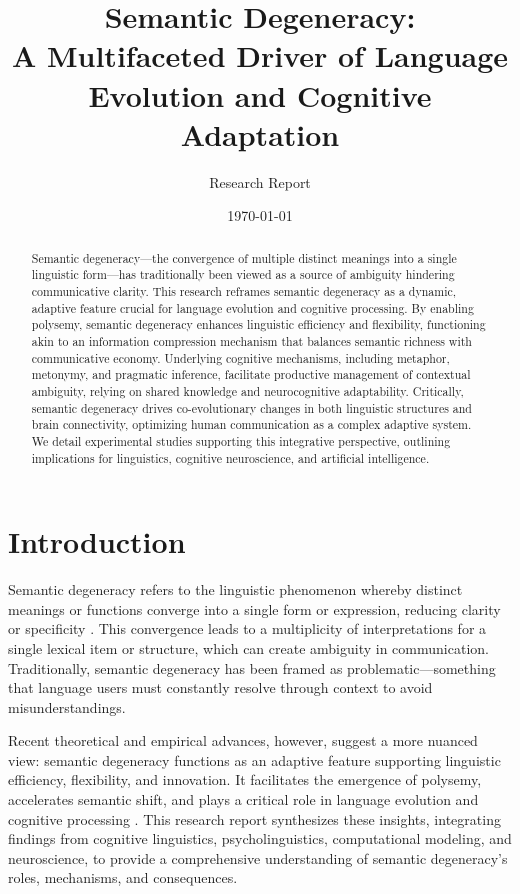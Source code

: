 \documentclass[12pt,a4paper]{article}
\title{Semantic Degeneracy:\\ 
A Multifaceted Driver of Language Evolution and Cognitive Adaptation}
\author{Research Report}
\date{\today}
\begin{document}
\maketitle
\begin{abstract}
Semantic degeneracy—the convergence of multiple distinct meanings into a single linguistic form—has traditionally been viewed as a source of ambiguity hindering communicative clarity. 
This research reframes semantic degeneracy as a dynamic, adaptive feature crucial for language evolution and cognitive processing. 
By enabling polysemy, semantic degeneracy enhances linguistic efficiency and flexibility, functioning akin to an information compression mechanism that balances semantic richness with communicative economy. 
Underlying cognitive mechanisms, including metaphor, metonymy, and pragmatic inference, facilitate productive management of contextual ambiguity, relying on shared knowledge and neurocognitive adaptability. 
Critically, semantic degeneracy drives co-evolutionary changes in both linguistic structures and brain connectivity, optimizing human communication as a complex adaptive system. 
We detail experimental studies supporting this integrative perspective, outlining implications for linguistics, cognitive neuroscience, and artificial intelligence.
\end{abstract}


\section{Introduction}

Semantic degeneracy refers to the linguistic phenomenon whereby distinct meanings or functions converge into a single form or expression, reducing clarity or specificity \cite{citation_needed}. This convergence leads to a multiplicity of interpretations for a single lexical item or structure, which can create ambiguity in communication. Traditionally, semantic degeneracy has been framed as problematic—something that language users must constantly resolve through context to avoid misunderstandings.

Recent theoretical and empirical advances, however, suggest a more nuanced view: semantic degeneracy functions as an adaptive feature supporting linguistic efficiency, flexibility, and innovation. It facilitates the emergence of polysemy, accelerates semantic shift, and plays a critical role in language evolution and cognitive processing \cite{citation_needed}. This research report synthesizes these insights, integrating findings from cognitive linguistics, psycholinguistics, computational modeling, and neuroscience, to provide a comprehensive understanding of semantic degeneracy’s roles, mechanisms, and consequences.
\end{document}
